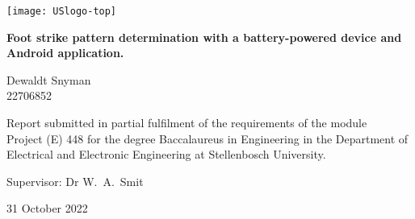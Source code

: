 \graphicspath{{frontmatter/fig/}}

\begin{titlepage}
	\begin{center}
		
		\texttt{[image: USlogo-top]}
		
		\vfill
		
		{\sffamily \bfseries \huge Foot strike pattern determination with a battery-powered device and Android application. \par}
		
		\vfill
		
		{\large {\Large Dewaldt Snyman} \\ 22706852 \par}
		
		\vfill
		
		\vfill
		
		{Report submitted in partial fulfilment of the requirements of the module \\
			Project (E) 448 for the degree Baccalaureus in Engineering in the Department of
			Electrical and Electronic Engineering at Stellenbosch University. \par}
		
		\vfill
		
		{\large {Supervisor}: Dr W.\ A.\ Smit} %
		
		\vfill
		
		{\Large 31 October 2022}
	\end{center}
\end{titlepage}
